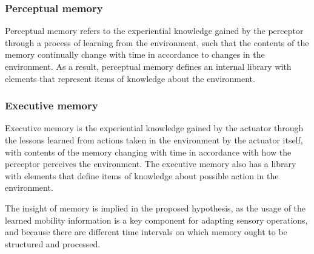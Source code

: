 \documentclass[ENG,PhD]{cinvestav}
\begin{document}
\subsubsection*{Perceptual memory}
Perceptual memory refers to the experiential knowledge gained by the perceptor through a process of learning from the environment, such that the contents of the memory continually change with time in accordance to changes in the environment. %
As a result, perceptual memory defines an internal library with elements that represent items of knowledge about the environment.

\subsubsection*{Executive memory}
Executive memory is the experiential knowledge gained by the actuator through the lessons learned from actions taken in the environment by the actuator itself, with contents of the memory changing with time in accordance with how the perceptor perceives the environment. %
The executive memory also has a library with elements that define items of knowledge about possible action in the environment.


The insight of memory is implied in the proposed hypothesis, as the usage of the learned mobility information is a key component for adapting sensory operations, and because there are different time intervals on which memory ought to be structured and processed.
\end{document}
